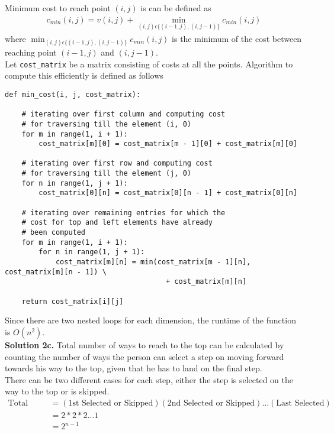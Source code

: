 \documentclass[11pt]{article}
\begin{document}
Minimum cost to reach point $(i, j)$ is can be defined as \\
\begin{align*}
c_{min}(i, j) = v(i, j) + \min_{(i, j) \epsilon \{(i-1, j), (i, j-1)\}}c_{min}(i, j)
\end{align*}
where $\min_{(i, j) \epsilon \{(i-1, j), (i, j-1)\}}c_{min}(i, j)$ is the minimum of the cost between reaching point $(i-1, j)$ and $(i, j-1)$. \\
Let \lstinline{cost_matrix} be a matrix consisting of costs at all the points. Algorithm to compute this efficiently is defined as follows\\
\begin{lstlisting}[basicstyle=\small]
def min_cost(i, j, cost_matrix):

    # iterating over first column and computing cost
    # for traversing till the element (i, 0)
    for m in range(1, i + 1):
        cost_matrix[m][0] = cost_matrix[m - 1][0] + cost_matrix[m][0]

    # iterating over first row and computing cost
    # for traversing till the element (j, 0)
    for n in range(1, j + 1):
        cost_matrix[0][n] = cost_matrix[0][n - 1] + cost_matrix[0][n]

    # iterating over remaining entries for which the
    # cost for top and left elements have already
    # been computed
    for m in range(1, i + 1):
        for n in range(1, j + 1):
            cost_matrix[m][n] = min(cost_matrix[m - 1][n], cost_matrix[m][n - 1]) \
                                      + cost_matrix[m][n]

    return cost_matrix[i][j]
\end{lstlisting}
Since there are two nested loops for each dimension, the runtime of the function is $O(n^2)$.\\
\linebreak
\textbf{Solution 2c.} Total number of ways to reach to the top can be calculated by counting the number of ways the person can select a step on moving forward towards his way to the top, given that he has to land on the final step. \\
\linebreak
There can be two different cases for each step, either the step is selected on the way to the top or is skipped. \\
\begin{align*}
\text{Total ways} & = (\text{1st Selected or Skipped}) (\text{2nd Selected or Skipped}) \dots (\text{Last Selected}) \\ 
&= 2 * 2 * 2 \dots 1 \\
& = 2^{n-1}
\end{align*}
\end{document}
